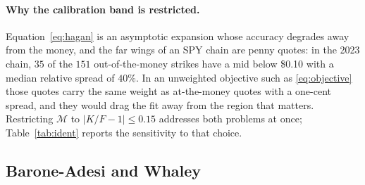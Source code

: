 \documentclass[11pt]{article}
\begin{document}
\paragraph{Why the calibration band is restricted.} Equation~\eqref{eq:hagan} is an
asymptotic expansion whose accuracy degrades away from the money, and the far wings of an
SPY chain are penny quotes: in the 2023 chain, $35$ of the $151$ out-of-the-money strikes
have a mid below \$0.10 with a median relative spread of $40\%$. In an unweighted
objective such as \eqref{eq:objective} those quotes carry the same weight as
at-the-money quotes with a one-cent spread, and they would drag the fit away from the
region that matters. Restricting $\mathcal{M}$ to $|K/F-1|\le0.15$ addresses both
problems at once; Table~\ref{tab:ident} reports the sensitivity to that choice.

\subsection{Barone-Adesi and Whaley}
\end{document}
